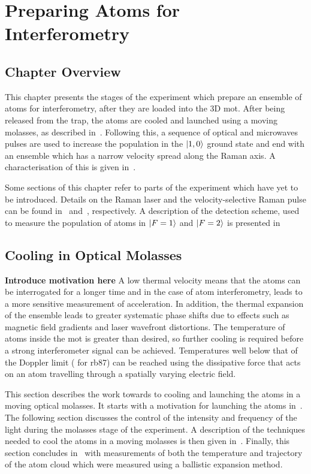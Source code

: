 \chapter{Preparing Atoms for Interferometry}\label{chap:atom_prep}
\section{Chapter Overview}
This chapter presents the stages of the experiment which prepare an
ensemble of atoms for interferometry, after they are loaded into the
3D \ac{mot}. After being released from the trap, the atoms are cooled
and launched using a moving molasses, as described
in~. Following this, a sequence of
optical and microwaves pulses are used to increase the population in
the \(\ket{1,0}\) ground state and end with an ensemble which has a
narrow velocity spread along the Raman axis. A characterisation of
this is given in~.
\par\noindent
Some sections of this chapter refer to parts of the experiment which
have yet to be introduced. Details on the Raman laser and the
velocity-selective Raman pulse can be found
in~
and~, respectively. A
description of the detection scheme, used to measure the population of
atoms in \(\ket{F=1}\) and \(\ket{F=2}\) is presented
in~


\section{Cooling in Optical Molasses}\label{sec:optical_molasses}
{\textbf{Introduce motivation here}}
A low thermal velocity means that the atoms can be interrogated for a
longer time and in the case of atom interferometry, leads to a more
sensitive measurement of acceleration. In addition, the thermal
expansion of the ensemble leads to greater systematic phase shifts due
to effects such as magnetic field gradients and laser wavefront
distortions. The temperature of atoms inside the \ac{mot} is greater
than desired, so further cooling is required before a strong
interferometer signal can be achieved. Temperatures well below that of
the Doppler limit ( for \ac{rb87}) can be
reached using the dissipative force that acts on an atom travelling
through a spatially varying electric field. 

\par\noindent
This section describes the work towards to cooling and launching the
atoms in a moving optical molasses. It starts with a motivation for
launching the atoms in~. The following
section discusses the control of the intensity and frequency of the
light during the molasses stage of the experiment. A description of
the techniques needed to cool the atoms in a moving molasses is then
given in~. Finally, this section
concludes in~ with measurements of
both the temperature and trajectory of the atom cloud which were
measured using a ballistic expansion method.


